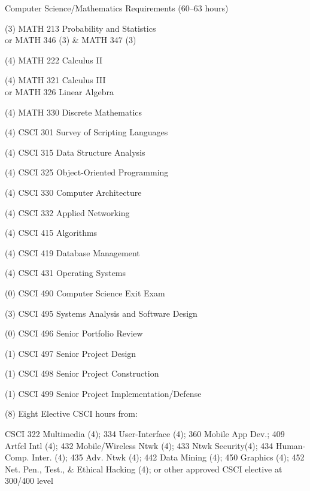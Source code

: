 \begin{reqgroup}{Computer Science/Mathematics Requirements (60--63 hours)}
\begin{checklist}
\begin{minipage}[t]{0.5\linewidth}
	\item (3) MATH 213 Probability and Statistics\\or MATH 346 (3) \& MATH 347 (3)
	\item (4) MATH 222 Calculus II
	\item (4) MATH 321 Calculus III\\or MATH 326 Linear Algebra
	\item (4) MATH 330 Discrete Mathematics

	\item (4) CSCI 301 Survey of Scripting Languages
	\item (4) CSCI 315 Data Structure Analysis
	\item (4) CSCI 325 Object-Oriented Programming
	\item (4) CSCI 330 Computer Architecture
	\item (4) CSCI 332 Applied Networking
	\item (4) CSCI 415 Algorithms
	\item (4) CSCI 419 Database Management


\end{minipage}
\begin{minipage}[t]{0.5\linewidth}
	\item (4) CSCI 431 Operating Systems
	\item (0) CSCI 490 Computer Science Exit Exam
	\item (3) CSCI 495 Systems Analysis and Software Design
	\item (0) CSCI 496 Senior Portfolio Review
	\item (1) CSCI 497 Senior Project Design
	\item (1) CSCI 498 Senior Project Construction
	\item (1) CSCI 499 Senior Project Implementation/Defense

	\item (8) Eight Elective CSCI hours from:
	\item \hspace{1em}\begin{minipage}[t]{\dimexpr\linewidth-1em\relax}CSCI 322 Multimedia (4); 334 User-Interface (4); 360 Mobile App Dev.; 409 Artfcl Intl (4); 432 Mobile/Wireless Ntwk (4); 433 Ntwk Security(4); 434 Human-Comp. Inter. (4); 435 Adv. Ntwk (4); 442 Data Mining (4); 450 Graphics (4); 452 Net. Pen., Test., \& Ethical Hacking (4); or other approved CSCI elective at 300/400 level\end{minipage}


\end{minipage}
\end{checklist}
\end{reqgroup}

